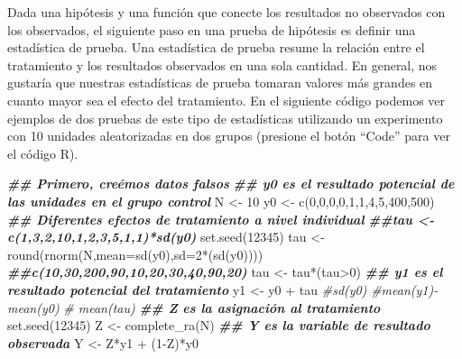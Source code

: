 \documentclass[
]{article}
\newenvironment{Shaded}{\begin{snugshade}}{\end{snugshade}}
\newcommand{\AttributeTok}[1]{\textcolor[rgb]{0.77,0.63,0.00}{#1}}
\newcommand{\CommentTok}[1]{\textcolor[rgb]{0.56,0.35,0.01}{\textit{#1}}}
\newcommand{\DecValTok}[1]{\textcolor[rgb]{0.00,0.00,0.81}{#1}}
\newcommand{\DocumentationTok}[1]{\textcolor[rgb]{0.56,0.35,0.01}{\textbf{\textit{#1}}}}
\newcommand{\FunctionTok}[1]{\textcolor[rgb]{0.00,0.00,0.00}{#1}}
\newcommand{\NormalTok}[1]{#1}
\newcommand{\OtherTok}[1]{\textcolor[rgb]{0.56,0.35,0.01}{#1}}
\newcommand{\SpecialCharTok}[1]{\textcolor[rgb]{0.00,0.00,0.00}{#1}}
\begin{document}
Dada una hipótesis y una función que conecte los resultados no observados con los observados, el siguiente paso en una prueba de hipótesis es definir una estadística de prueba. Una estadística de prueba resume la relación entre el tratamiento y los resultados observados en una sola cantidad. En general, nos gustaría que nuestras estadísticas de prueba tomaran valores más grandes en cuanto mayor sea el efecto del tratamiento. En el siguiente código podemos ver ejemplos de dos pruebas de este tipo de estadísticas utilizando un experimento con 10 unidades aleatorizadas en dos
grupos (presione el botón ``Code'' para ver el código R).

\begin{Shaded}
\begin{Highlighting}[]
\DocumentationTok{\#\# Primero, creémos datos falsos}
\DocumentationTok{\#\# y0 es el resultado potencial de las unidades en el grupo control}
\NormalTok{N }\OtherTok{\textless{}{-}} \DecValTok{10}
\NormalTok{y0 }\OtherTok{\textless{}{-}} \FunctionTok{c}\NormalTok{(}\DecValTok{0}\NormalTok{,}\DecValTok{0}\NormalTok{,}\DecValTok{0}\NormalTok{,}\DecValTok{0}\NormalTok{,}\DecValTok{1}\NormalTok{,}\DecValTok{1}\NormalTok{,}\DecValTok{4}\NormalTok{,}\DecValTok{5}\NormalTok{,}\DecValTok{400}\NormalTok{,}\DecValTok{500}\NormalTok{)}
\DocumentationTok{\#\# Diferentes efectos de tratamiento a nivel individual}
\DocumentationTok{\#\#tau \textless{}{-} c(1,3,2,10,1,2,3,5,1,1)*sd(y0)}
\FunctionTok{set.seed}\NormalTok{(}\DecValTok{12345}\NormalTok{)}
\NormalTok{tau }\OtherTok{\textless{}{-}} \FunctionTok{round}\NormalTok{(}\FunctionTok{rnorm}\NormalTok{(N,}\AttributeTok{mean=}\FunctionTok{sd}\NormalTok{(y0),}\AttributeTok{sd=}\DecValTok{2}\SpecialCharTok{*}\NormalTok{(}\FunctionTok{sd}\NormalTok{(y0)))) }\DocumentationTok{\#\#c(10,30,200,90,10,20,30,40,90,20)}
\NormalTok{tau }\OtherTok{\textless{}{-}}\NormalTok{ tau}\SpecialCharTok{*}\NormalTok{(tau}\SpecialCharTok{\textgreater{}}\DecValTok{0}\NormalTok{)}
\DocumentationTok{\#\# y1 es el resultado potencial del tratamiento}
\NormalTok{y1 }\OtherTok{\textless{}{-}}\NormalTok{ y0 }\SpecialCharTok{+}\NormalTok{ tau}
\CommentTok{\#sd(y0)}
\CommentTok{\#mean(y1){-}mean(y0)}
\CommentTok{\# mean(tau)}
\DocumentationTok{\#\# Z es la asignación al tratamiento}
\FunctionTok{set.seed}\NormalTok{(}\DecValTok{12345}\NormalTok{)}
\NormalTok{Z }\OtherTok{\textless{}{-}} \FunctionTok{complete\_ra}\NormalTok{(N)}
\DocumentationTok{\#\# Y es la variable de resultado observada}
\NormalTok{Y }\OtherTok{\textless{}{-}}\NormalTok{ Z}\SpecialCharTok{*}\NormalTok{y1 }\SpecialCharTok{+}\NormalTok{ (}\DecValTok{1}\SpecialCharTok{{-}}\NormalTok{Z)}\SpecialCharTok{*}\NormalTok{y0}

\end{Highlighting}
\end{Shaded}
\end{document}
